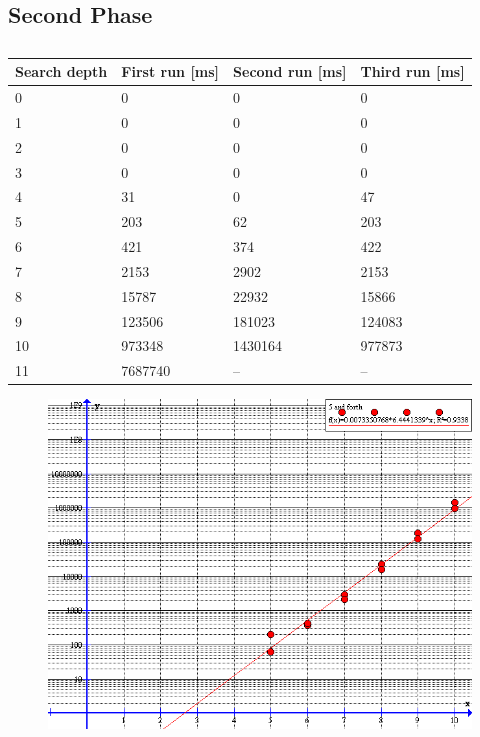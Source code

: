 \subsection{Second Phase}

\begin{table}[hb]
\centering
	\begin{tabular}{|l|l|l|l|}
	\hline
	Search depth&First run [ms]&Second run [ms]&Third run [ms]\\
	\hline
	0&0&0&0\\
	\hline
	1&0&0&0\\
	\hline
	2&0&0&0\\
	\hline
	3&0&0&0\\
	\hline
	4&31&0&47\\
	\hline
	5&203&62&203\\
	\hline
	6&421&374&422\\
	\hline
	7&2153&2902&2153\\
	\hline
	8&15787&22932&15866\\
	\hline
	9&123506&181023&124083\\
	\hline
	10&973348&1430164&977873\\
	\hline
	11&7687740&--&--\\
	\hline
	\end{tabular}
\caption{}
	\label{tab:timeData2}
\end{table}

\begin{figure}[htb]
	\centering
		\includegraphics[scale=0.5]{input/pics/timeFunction2}
	\caption{}
	\label{fig:timeFunction}
\end{figure}